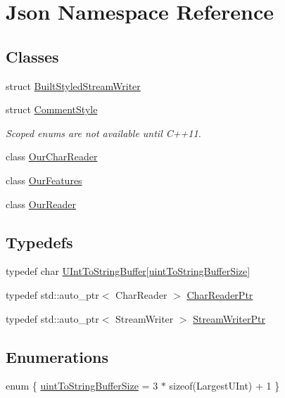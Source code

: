 \hypertarget{namespace_json}{}\section{Json Namespace Reference}
\label{namespace_json}
\subsection*{Classes}
\begin{DoxyCompactItemize}
\item 
struct \hyperlink{struct_json_1_1_built_styled_stream_writer}{Built\+Styled\+Stream\+Writer}
\item 
struct \hyperlink{struct_json_1_1_comment_style}{Comment\+Style}
\begin{DoxyCompactList}\small\item\em Scoped enums are not available until C++11. \end{DoxyCompactList}\item 
class \hyperlink{class_json_1_1_our_char_reader}{Our\+Char\+Reader}
\item 
class \hyperlink{class_json_1_1_our_features}{Our\+Features}
\item 
class \hyperlink{class_json_1_1_our_reader}{Our\+Reader}
\end{DoxyCompactItemize}
\subsection*{Typedefs}
\begin{DoxyCompactItemize}
\item 
typedef char \hyperlink{namespace_json_a602bcf69c2042fb61c3b243cb16f04ca}{U\+Int\+To\+String\+Buffer}\mbox{[}\hyperlink{namespace_json_a0c5f614b019f20b4598dcaec09d9e820ae4f2008c7919f20d81286121d1374424}{uint\+To\+String\+Buffer\+Size}\mbox{]}
\item 
typedef std\+::auto\+\_\+ptr$<$ Char\+Reader $>$ \hyperlink{namespace_json_a4724efb8d41614b47036cb8b54233837}{Char\+Reader\+Ptr}
\item 
typedef std\+::auto\+\_\+ptr$<$ Stream\+Writer $>$ \hyperlink{namespace_json_a7132404aeebfc96d7c6ad2c66260afb5}{Stream\+Writer\+Ptr}
\end{DoxyCompactItemize}
\subsection*{Enumerations}
\begin{DoxyCompactItemize}
\item 
enum \{ \hyperlink{namespace_json_a0c5f614b019f20b4598dcaec09d9e820ae4f2008c7919f20d81286121d1374424}{uint\+To\+String\+Buffer\+Size} = 3 $\ast$ sizeof(Largest\+U\+Int) + 1
 \}
\end{DoxyCompactItemize}
